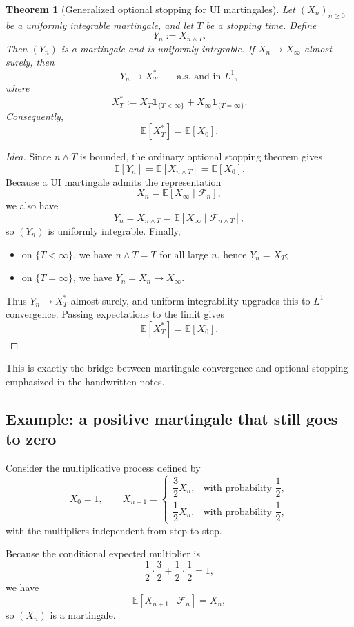 \documentclass[11pt]{article}
\newtheorem{theorem}{Theorem}[section]
\theoremstyle{definition}
\begin{document}
\begin{theorem}[Generalized optional stopping for UI martingales]
Let \((X_n)_{n\ge 0}\) be a uniformly integrable martingale, and let \(T\) be a stopping time. Define
\[
Y_n := X_{n\wedge T}.
\]
Then \((Y_n)\) is a martingale and is uniformly integrable. If \(X_n\to X_\infty\) almost surely, then
\[
Y_n \to X_T^*
\qquad \text{a.s. and in } L^1,
\]
where
\[
X_T^* := X_T\mathbf 1_{\{T<\infty\}} + X_\infty\mathbf 1_{\{T=\infty\}}.
\]
Consequently,
\[
\mathbb E[X_T^*] = \mathbb E[X_0].
\]
\end{theorem}

\begin{proof}[Idea]
Since \(n\wedge T\) is bounded, the ordinary optional stopping theorem gives
\[
\mathbb E[Y_n] = \mathbb E[X_{n\wedge T}] = \mathbb E[X_0].
\]
Because a UI martingale admits the representation
\[
X_n = \mathbb E[X_\infty\mid \mathcal F_n],
\]
we also have
\[
Y_n = X_{n\wedge T} = \mathbb E[X_\infty\mid \mathcal F_{n\wedge T}],
\]
so \((Y_n)\) is uniformly integrable. Finally,
\begin{itemize}[leftmargin=2em]
    \item on \(\{T<\infty\}\), we have \(n\wedge T=T\) for all large \(n\), hence \(Y_n=X_T\);
    \item on \(\{T=\infty\}\), we have \(Y_n=X_n\to X_\infty\).
\end{itemize}
Thus \(Y_n\to X_T^*\) almost surely, and uniform integrability upgrades this to \(L^1\)-convergence. Passing expectations to the limit gives
\[
\mathbb E[X_T^*] = \mathbb E[X_0].
\]
\end{proof}

This is exactly the bridge between martingale convergence and optional stopping emphasized in the handwritten notes.

\subsection{Example: a positive martingale that still goes to zero}

Consider the multiplicative process defined by
\[
X_0=1,
\qquad
X_{n+1}=
\begin{cases}
\dfrac{3}{2}X_n, & \text{with probability } \dfrac12,\\[0.6em]
\dfrac12 X_n, & \text{with probability } \dfrac12,
\end{cases}
\]
with the multipliers independent from step to step.

Because the conditional expected multiplier is
\[
\frac12\cdot \frac32 + \frac12\cdot \frac12 = 1,
\]
we have
\[
\mathbb E[X_{n+1}\mid \mathcal F_n] = X_n,
\]
so \((X_n)\) is a martingale.
\end{document}
